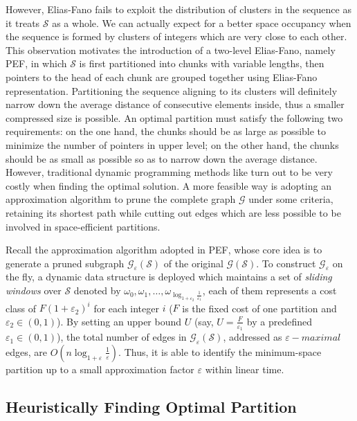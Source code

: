 \documentclass[runningheads,a4paper]{llncs}
\begin{document}
However, Elias-Fano fails to exploit the distribution of clusters in the sequence as it treats $ \mathcal{S} $ as a whole.
We can actually expect for a better space occupancy when the sequence is formed by clusters of integers which are very close to each other.
This observation motivates the introduction of a two-level Elias-Fano, namely PEF, in which $ \mathcal{S} $ is first partitioned into chunks with variable lengths, then pointers to the head of each chunk are grouped together using Elias-Fano representation.
Partitioning the sequence aligning to its clusters will definitely narrow down the average distance of consecutive elements inside, thus a smaller compressed size is possible.
An optimal partition must satisfy the following two requirements: on the one hand, the chunks should be as large as possible to minimize the number of pointers in upper level; on the other hand, the chunks should be as small as possible so as to narrow down the average distance.
However, traditional dynamic programming methods like \cite{silvestri2010vsencoding} turn out to be very costly when finding the optimal solution.
A more feasible way is adopting an approximation algorithm to prune the complete graph $ \mathcal{G} $ under some criteria, retaining its shortest path while cutting out edges which are less possible to be involved in space-efficient partitions.

Recall the approximation algorithm adopted in PEF, whose core idea is to generate a pruned subgraph $\mathcal{G}_{\varepsilon}\left(\mathcal{S}\right)$ of the original $\mathcal{G}\left(\mathcal{S}\right)$.
To construct $\mathcal{G}_{\varepsilon}$ on the fly, a dynamic data structure is deployed which maintains a set of \textit{sliding windows} over $\mathcal{S}$ denoted by $\omega_{0},\omega_{1},\dots, \omega_{\log_{1+\varepsilon_2}\frac{1}{\varepsilon_1}}$, each of them represents a cost class of $F\left(1+\varepsilon_2\right)^{i}$ for each integer $i$ ($F$ is the fixed cost of one partition and $\varepsilon_{2}\in\left(0,1\right)$).
By setting an upper bound $U$ (say, $U=\frac{F}{\varepsilon_{1}}$ by a predefined $\varepsilon_{1}\in\left(0,1\right)$), the total number of edges in $\mathcal{G}_{\varepsilon}\left(\mathcal{S}\right)$, addressed as $\varepsilon-maximal$ edges, are $O\left(n\log_{1+\varepsilon}\frac{1}{\varepsilon}\right)$.
Thus, it is able to identify the minimum-space partition  up to a small approximation factor $ \varepsilon $ within linear time.

\subsection{Heuristically Finding Optimal Partition}
\end{document}
